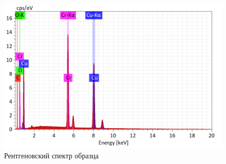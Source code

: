 \documentclass[a4paper,12pt]{article} %
\begin{document}
\begin{figure}[h]
\centering
\includegraphics[width=\textwidth]{spectrum_plot.png}
\caption{Рентгеновский спектр образца}
\label{fig:plot}
\end{figure}
\end{document}
